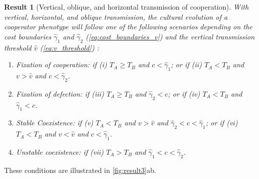 \documentclass[12pt]{extarticle}
\newtheorem{result}{Result}
\begin{document}
{\begin{result}[Vertical, oblique, and horizontal transmission of cooperation] \label{result:vert_obli_hori}
With vertical, horizontal, and oblique transmission, the cultural evolution of a cooperator phenotype will follow one of the following scenarios depending on the cost boundaries $\hat\gamma_1$ and $\hat\gamma_2$ (\autoref{eq:cost_boundaries_v}) and the vertical transmission threshold $\hat v$ (\autoref{eq:v_threshold}) :


\begin{enumerate}
\item \emph{Fixation of cooperation}: 
	if \emph{(i)} $T_A \ge T_B$ and $c < \hat\gamma_1$; or 
	if \emph{(ii)} $T_A < T_B$ and $v>\hat v$ and $c < \hat\gamma_2$.
\item \emph{Fixation of defection}: 
    if \emph{(iii)} $T_A \ge T_B$ and $\hat\gamma_2 < c$; or 
	if \emph{(iv)} $T_A < T_B$ and $\hat\gamma_1 < c$.
\item \emph{Stable Coexistence}: 
    if \emph{(v)} $T_A < T_B$ and $v>\hat{v}$ and $\hat\gamma_2 < c < \hat\gamma_1$; or
    if \emph{(vi)} $T_A < T_B$ and $v<\hat{v}$ and $c < \hat\gamma_1$.
\item \emph{Unstable coexistence}:
    if \emph{(vii)} $T_A > T_B$ and $\hat\gamma_1 < c < \hat\gamma_2$.
\end{enumerate}

\end{result}
These conditions are illustrated in \autoref{fig:result3}ab.

}
\end{document}
